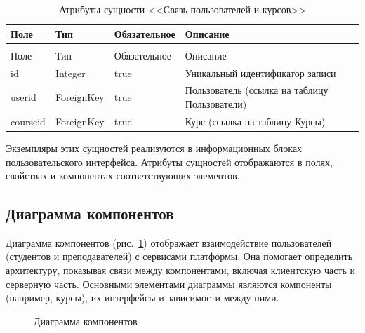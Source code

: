 \begin{xltabular}{\textwidth}{|l|l|p{3.2cm}|X|}
	\caption{Атрибуты сущности <<Связь пользователей и курсов>>\label{user_courses:table}}\\ \hline
	Поле & Тип & Обязательное & Описание \\ \hline
	\endfirsthead
	\\ \hline
	Поле & Тип & Обязательное & Описание \\ \hline
	\endhead
	id & Integer & true & Уникальный идентификатор записи \\ \hline
	userid & ForeignKey & true & Пользователь (ссылка на таблицу Пользователи) \\ \hline
	courseid & ForeignKey & true & Курс (ссылка на таблицу Курсы) \\ \hline
\end{xltabular}

Экземпляры этих сущностей реализуются в информационных блоках пользовательского интерфейса. Атрибуты сущностей отображаются в полях, свойствах и компонентах соответствующих элементов.


\subsection{Диаграмма компонентов}

Диаграмма компонентов (рис.~\ref{diag:image}) отображает взаимодействие пользователей (студентов и преподавателей) с сервисами платформы. Она помогает определить архитектуру, показывая связи между компонентами, включая клиентскую часть и серверную часть. Основными элементами диаграммы являются компоненты (например, курсы), их интерфейсы и зависимости между ними.


\begin{figure}[htp!]
	\caption{Диаграмма компонентов}
	\label{diag:image}
\end{figure}

